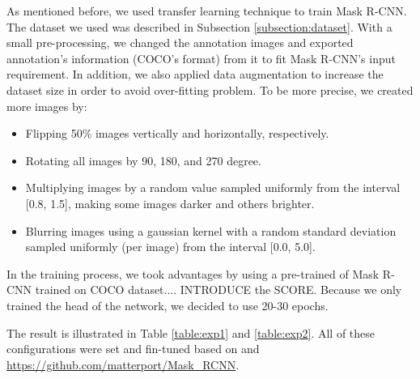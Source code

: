 	As mentioned before, we used transfer learning technique to train Mask R-CNN. The dataset we used was described in Subsection \ref{subsection:dataset}. With a small pre-processing, we changed the annotation images and exported annotation's information (COCO's format) from it to fit Mask R-CNN's input requirement. In addition, we also applied data augmentation to increase the dataset size in order to avoid over-fitting problem. To be more precise, we created more images by:
	
	\begin{itemize}
		\item Flipping 50\% images vertically and horizontally, respectively.
		\item Rotating all images by 90, 180, and 270 degree.
		\item Multiplying images by a random value sampled uniformly from the interval [0.8, 1.5], making some images darker and others brighter.
		\item Blurring images using a gaussian kernel with a random standard deviation sampled uniformly (per image) from the interval [0.0, 5.0].
	\end{itemize}
	
	In the training process, we took advantages by using a pre-trained of Mask R-CNN trained on COCO dataset.... INTRODUCE the SCORE. Because we only trained the head of the network, we decided to use 20-30 epochs.
	
	
	The result is illustrated in Table \ref{table:exp1} and \ref{table:exp2}. All of these configurations were set and fin-tuned based on \cite{maskrcnn} and \url{https://github.com/matterport/Mask_RCNN}.
	

